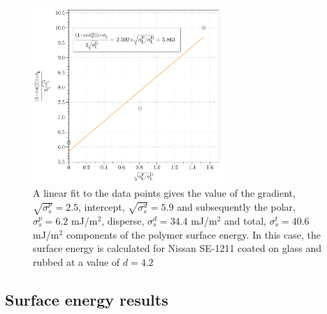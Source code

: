 \begin{figure}
\begin{center}
\includegraphics[width=0.65\textwidth]{Figures/Pretilt/owrk}
\end{center}
\caption[Calculation of surface energies]{\label{fig:owrk}{A linear fit to the data points gives the value of the gradient, $\sqrt{\sigma_s^p}=2.5$, intercept, $\sqrt{\sigma_s^d}=5.9$ and subsequently the polar, $\sigma_s^p=6.2$ mJ/m$^2$, disperse, $\sigma_s^d=34.4$ mJ/m$^2$ and total, $\sigma_s^t=40.6$ mJ/m$^2$ components of the polymer surface energy. In this case, the surface energy is calculated for Nissan SE-1211 coated on glass and rubbed at a value of $d=4.2$}}
\end{figure}

\subsection{Surface energy results}

